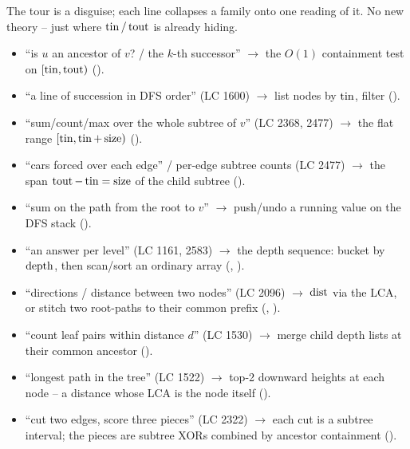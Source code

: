 
The tour is a disguise; each line collapses a family onto one reading of it. No new theory --
just where $\operatorname{tin}/\operatorname{tout}$ is already hiding.

\begin{itemize}[nosep, leftmargin=1.4em]
  \item ``is $u$ an ancestor of $v$? / the $k$-th successor'' $\longrightarrow$ the $O(1)$
        containment test on $[\operatorname{tin},\operatorname{tout})$ ().
  \item ``a line of succession in DFS order'' (LC 1600) $\longrightarrow$ list nodes by $\operatorname{tin}$,
        filter ().
  \item ``sum/count/max over the whole subtree of $v$'' (LC 2368, 2477) $\longrightarrow$ the
        flat range $[\operatorname{tin},\operatorname{tin}{+}\operatorname{size})$ ().
  \item ``cars forced over each edge'' / per-edge subtree counts (LC 2477) $\longrightarrow$ the
        span $\operatorname{tout}-\operatorname{tin}=\operatorname{size}$ of the child subtree ().
  \item ``sum on the path from the root to $v$'' $\longrightarrow$ push/undo a running value on
        the DFS stack ().
  \item ``an answer per level'' (LC 1161, 2583) $\longrightarrow$ the depth sequence: bucket by
        $\operatorname{depth}$, then scan/sort an ordinary array (, ).
  \item ``directions / distance between two nodes'' (LC 2096) $\longrightarrow$ $\operatorname{dist}$ via the
        LCA, or stitch two root-paths to their common prefix (,
        ).
  \item ``count leaf pairs within distance $d$'' (LC 1530) $\longrightarrow$ merge child depth
        lists at their common ancestor ().
  \item ``longest path in the tree'' (LC 1522) $\longrightarrow$ top-2 downward heights at each
        node -- a distance whose LCA is the node itself ().
  \item ``cut two edges, score three pieces'' (LC 2322) $\longrightarrow$ each cut is a subtree
        interval; the pieces are subtree XORs combined by ancestor containment ().
\end{itemize}


